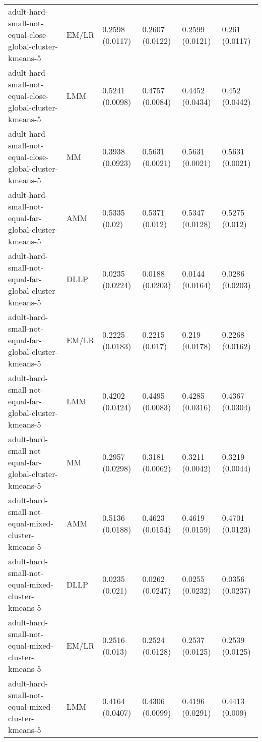 \begin{tabular}{llllll}
                               adult-hard-small-not-equal-close-global-cluster-kmeans-5 &     EM/LR & 0.2598 (0.0117) &  0.2607 (0.0122) &   0.2599 (0.0121) &      0.261 (0.0117) \\
                               adult-hard-small-not-equal-close-global-cluster-kmeans-5 &       LMM & 0.5241 (0.0098) &  0.4757 (0.0084) &   0.4452 (0.0434) &      0.452 (0.0442) \\
                               adult-hard-small-not-equal-close-global-cluster-kmeans-5 &        MM & 0.3938 (0.0923) &  0.5631 (0.0021) &   0.5631 (0.0021) &     0.5631 (0.0021) \\
                                 adult-hard-small-not-equal-far-global-cluster-kmeans-5 &       AMM &   0.5335 (0.02) &   0.5371 (0.012) &   0.5347 (0.0128) &      0.5275 (0.012) \\
                                 adult-hard-small-not-equal-far-global-cluster-kmeans-5 &      DLLP & 0.0235 (0.0224) &  0.0188 (0.0203) &   0.0144 (0.0164) &     0.0286 (0.0203) \\
                                 adult-hard-small-not-equal-far-global-cluster-kmeans-5 &     EM/LR & 0.2225 (0.0183) &   0.2215 (0.017) &    0.219 (0.0178) &     0.2268 (0.0162) \\
                                 adult-hard-small-not-equal-far-global-cluster-kmeans-5 &       LMM & 0.4202 (0.0424) &  0.4495 (0.0083) &   0.4285 (0.0316) &     0.4367 (0.0304) \\
                                 adult-hard-small-not-equal-far-global-cluster-kmeans-5 &        MM & 0.2957 (0.0298) &  0.3181 (0.0062) &   0.3211 (0.0042) &     0.3219 (0.0044) \\
                                      adult-hard-small-not-equal-mixed-cluster-kmeans-5 &       AMM & 0.5136 (0.0188) &  0.4623 (0.0154) &   0.4619 (0.0159) &     0.4701 (0.0123) \\
                                      adult-hard-small-not-equal-mixed-cluster-kmeans-5 &      DLLP &  0.0235 (0.021) &  0.0262 (0.0247) &   0.0255 (0.0232) &     0.0356 (0.0237) \\
                                      adult-hard-small-not-equal-mixed-cluster-kmeans-5 &     EM/LR &  0.2516 (0.013) &  0.2524 (0.0128) &   0.2537 (0.0125) &     0.2539 (0.0125) \\
                                      adult-hard-small-not-equal-mixed-cluster-kmeans-5 &       LMM & 0.4164 (0.0407) &  0.4306 (0.0099) &   0.4196 (0.0291) &      0.4413 (0.009) \\

\end{tabular}
